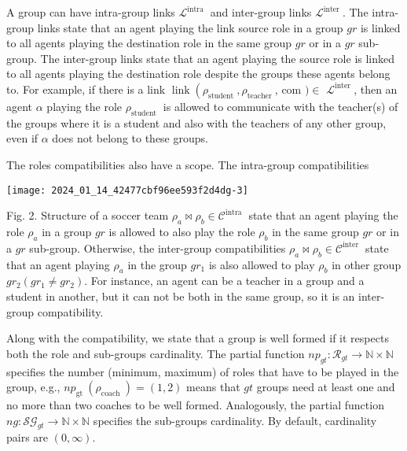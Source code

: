\documentclass[10pt]{article}
\begin{document}
A group can have intra-group links $\mathcal{L}^{\text {intra }}$ and inter-group links $\mathcal{L}^{\text {inter }}$. The intra-group links state that an agent playing the link source role in a group $g r$ is linked to all agents playing the destination role in the same group $g r$ or in a $g r$ sub-group. The inter-group links state that an agent playing the source role is linked to all agents playing the destination role despite the groups these agents belong to. For example, if there is a link $\operatorname{link}\left(\rho_{\text {student }}, \rho_{\text {teacher }}\right.$, com $) \in$ $\mathcal{L}^{\text {inter }}$, then an agent $\alpha$ playing the role $\rho_{\text {student }}$ is allowed to communicate with the teacher(s) of the groups where it is a student and also with the teachers of any other group, even if $\alpha$ does not belong to these groups.

The roles compatibilities also have a scope. The intra-group compatibilities

\begin{center}
\texttt{[image: 2024\_01\_14\_42477cbf96ee593f2d4dg-3]}
\end{center}

Fig. 2. Structure of a soccer team $\rho_{a} \bowtie \rho_{b} \in \mathcal{C}^{\text {intra }}$ state that an agent playing the role $\rho_{a}$ in a group $g r$ is allowed to also play the role $\rho_{b}$ in the same group $g r$ or in a $g r$ sub-group. Otherwise, the inter-group compatibilities $\rho_{a} \bowtie \rho_{b} \in \mathcal{C}^{\text {inter }}$ state that an agent playing $\rho_{a}$ in the group $g r_{1}$ is also allowed to play $\rho_{b}$ in other group $g r_{2}\left(g r_{1} \neq g r_{2}\right)$. For instance, an agent can be a teacher in a group and a student in another, but it can not be both in the same group, so it is an inter-group compatibility.

Along with the compatibility, we state that a group is well formed if it respects both the role and sub-groups cardinality. The partial function $n p_{g t}: \mathcal{R}_{g t} \rightarrow \mathbb{N} \times \mathbb{N}$ specifies the number (minimum, maximum) of roles that have to be played in the group, e.g., $n p_{\text {gt }}\left(\rho_{\text {coach }}\right)=(1,2)$ means that $g t$ groups need at least one and no more than two coaches to be well formed. Analogously, the partial function $n g: \mathcal{S G}_{g t} \rightarrow \mathbb{N} \times \mathbb{N}$ specifies the sub-groups cardinality. By default, cardinality pairs are $(0, \infty)$.
\end{document}
